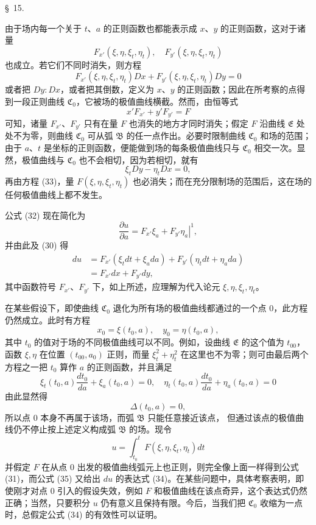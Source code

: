 \documentclass[11pt,a4paper,leqno]{article}
\begin{document}
\begin{center}{\large \S~15.}\end{center}

由于场内每一个关于 $t$、$a$ 的正则函数也都能表示成 $x$、$y$ 的正则函数，这对于诸量
\[
F_{x'}(\xi,\eta,\xi_t,\eta_t),\quad F_{y'}(\xi,\eta,\xi_t,\eta_t)
\]
也成立。若它们不同时消失，则方程
\begin{equation}\tag{33}
F_{x'}(\xi,\eta,\xi_t,\eta_t)Dx+F_{y'}(\xi,\eta,\xi_t,\eta_t)Dy=0
\end{equation}
或者把 $Dy:Dx$，或者把其倒数，定义为 $x$、$y$ 的正则函数；因此在所考察的点得到一段正则曲线 $\mathfrak{C}_0$，它被场的极值曲线横截。然而，由恒等式
\[
x'F_{x'}+y'F_{y'}=F
\]
可知，诸量 $F_{x'}$、$F_{y'}$ 只有在量 $F$ 也消失的地方才同时消失；假定 $F$ 沿曲线 $\mathfrak{E}$ 处处不为零，则曲线 $\mathfrak{C}_0$ 可从弧 $\mathfrak{B}$ 的任一点作出。必要时限制曲线 $\mathfrak{C}_0$ 和场的范围；由于 $a$、$t$ 是坐标的正则函数，便能做到场的每条极值曲线只与 $\mathfrak{C}_0$ 相交一次。显然，极值曲线与 $\mathfrak{C}_0$ 也不会相切，因为若相切，就有
\[
\xi_tDy-\eta_tDx=0,
\]
再由方程 (33)，量 $F(\xi,\eta,\xi_t,\eta_t)$ 也必消失；而在充分限制场的范围后，这在场的任何极值曲线上都不发生。

公式 (32) 现在简化为
\[
\frac{\partial u}{\partial a}=\left.F_{x'}\xi_a+F_{y'}\eta_a\right|^1,
\]
并由此及 (30) 得
\begin{equation}\tag{34}
\begin{split}
du&=F_{x'}(\xi_tdt+\xi_a da)+F_{y'}(\eta_tdt+\eta_a da)\\
&=F_{x'}dx+F_{y'}dy,
\end{split}
\end{equation}
其中函数符号 $F_{x'}$、$F_{y'}$ 下，如上所述，应理解为代入论元 $\xi,\eta,\xi_t,\eta_t$。

在某些假设下，即使曲线 $\mathfrak{C}_0$ 退化为所有场的极值曲线都通过的一个点 0，此方程仍然成立。此时有方程
\[
x_0=\xi(t_0,a),\quad y_0=\eta(t_0,a),
\]
其中 $t_0$ 的值对于场的不同极值曲线可以不同。例如，设曲线 $\mathfrak{E}$ 的这个值为 $t_{00}$，函数 $\xi,\eta$ 在位置 $(t_{00},a_0)$ 正则，而量 $\xi_t^2+\eta_t^2$ 在这里也不为零；则可由最后两个方程之一把 $t_0$ 算作 $a$ 的正则函数，并且满足
\begin{equation}\tag{35}
\xi_t(t_0,a)\frac{dt_0}{da}+\xi_a(t_0,a)=0,
\quad
\eta_t(t_0,a)\frac{dt_0}{da}+\eta_a(t_0,a)=0
\end{equation}
由此显然得
\[
\Delta(t_0,a)=0,
\]
所以点 0 本身不再属于该场，而弧 $\mathfrak{B}$ 只能任意接近该点，
但通过该点的极值曲线仍不停止按上述定义构成弧 $\mathfrak{B}$ 的场。现令
\[
u=\int_{t_0}^{t}F(\xi,\eta,\xi_t,\eta_t)dt
\]
并假定 $F$ 在从点 0 出发的极值曲线弧元上也正则，则完全像上面一样得到公式 (31)，而公式 (35) 又给出 $du$ 的表达式 (34)。在某些问题中，具体考察表明，即使刚才对点 0 引入的假设失效，例如 $F$ 和极值曲线在该点奇异，这个表达式仍然正确；当然，只要积分 $u$ 仍有意义且保持有限。今后，当我们把 $\mathfrak{C}_0$ 收缩为一点时，总假定公式 (34) 的有效性可以证明。
\end{document}
